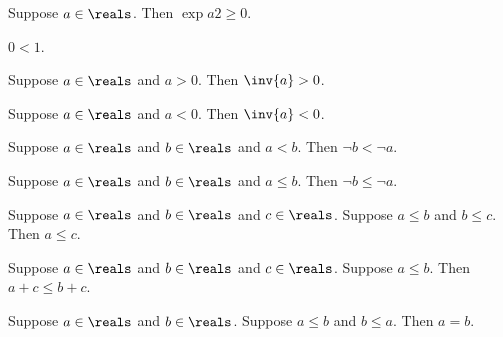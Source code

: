 \begin{proposition}\label{real_sq_nonnegative}
    Suppose $a\in\reals$.
    Then $\exp{a}{2} \geq 0$.
\end{proposition}

\begin{proposition}\label{real_zero_lt_one}
    $0 < 1$.
\end{proposition}

\begin{proposition}\label{real_inv_pos}
    Suppose $a\in\reals$ and $a > 0$.
    Then $\inv{a} > 0$.
\end{proposition}

\begin{proposition}\label{real_inv_neg}
    Suppose $a\in\reals$ and $a < 0$.
    Then $\inv{a} < 0$.
\end{proposition}

\begin{proposition}\label{real_lt_neg}
    Suppose $a\in\reals$ and $b\in\reals$ and $a < b$.
    Then $\neg{b} < \neg{a}$.
\end{proposition}

\begin{lemma}\label{real_leq_neg}
    Suppose $a\in\reals$ and $b\in\reals$ and $a \leq b$.
    Then $\neg{b} \leq \neg{a}$.
\end{lemma}

\begin{lemma}\label{real_leq_trans}
    Suppose $a\in\reals$ and $b\in\reals$ and $c\in\reals$.
    Suppose $a \leq b$ and $b \leq c$.
    Then $a \leq c$.
\end{lemma}

\begin{lemma}\label{real_leq_add}
    Suppose $a\in\reals$ and $b\in\reals$ and $c\in\reals$.
    Suppose $a \leq b$.
    Then $a + c \leq b + c$.
\end{lemma}

\begin{lemma}\label{real_leq_antisym}
    Suppose $a\in\reals$ and $b\in\reals$.
    Suppose $a \leq b$ and $b \leq a$.
    Then $a = b$.
\end{lemma}

